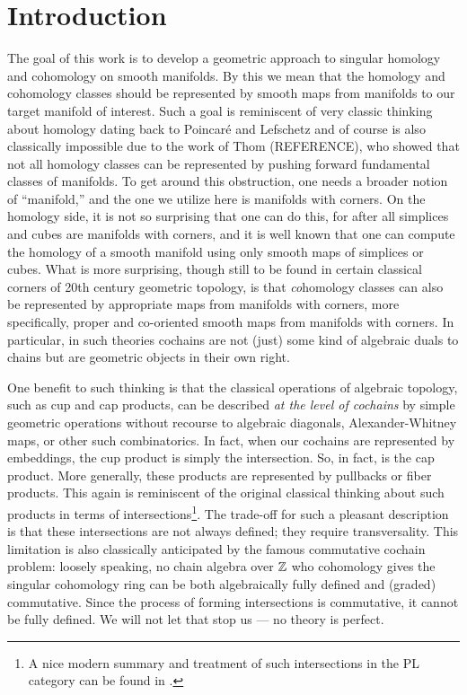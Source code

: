 
\section{Introduction}\label{intro}


The goal of this work is to develop a geometric approach to singular homology and cohomology on smooth manifolds. By this we mean that the homology and cohomology classes should be represented by smooth maps from manifolds to our target manifold of interest. Such a goal is reminiscent of very classic thinking about homology dating back to Poincar\'e and Lefschetz and of course is also classically impossible due to the work of Thom (REFERENCE), who showed that not all homology classes can be represented by pushing forward fundamental classes of manifolds. To get around this obstruction, one needs a broader notion of ``manifold,'' and the one we utilize here is manifolds with corners. On the homology side, it is not so surprising that one can do this, for after all simplices and cubes are manifolds with corners, and it is well known that one can compute the homology of a smooth manifold using only smooth maps of simplices or cubes. What is more surprising, though still to be found in certain classical corners of 20th century geometric topology, is that \textit{co}homology classes can also be represented by appropriate maps from manifolds with corners, more specifically, proper and co-oriented smooth maps from manifolds with corners. In particular, in such theories cochains are not (just) some kind of algebraic duals to chains but are geometric objects in their own right.

One benefit to such thinking is that the classical operations of algebraic topology, such as cup and cap products, can be described \textit{at the level of cochains} by simple geometric operations without recourse to algebraic diagonals, Alexander-Whitney maps, or other such combinatorics. In fact, when our cochains are represented by embeddings, the cup product is simply the intersection. So, in fact, is the cap product. More generally, these products are represented by pullbacks or fiber products. This again is reminiscent of the original classical thinking about such products in terms of intersections\footnote{A nice modern summary and treatment of such intersections in the PL category can be found in \cite{McC06}.}.
The trade-off for such a pleasant description is that these intersections are not always defined; they require transversality. This limitation is also classically anticipated by the famous commutative cochain problem: loosely speaking, no chain algebra over $\mathbb{Z}$ who cohomology gives the singular cohomology ring can be both algebraically fully defined and (graded) commutative. Since the process of forming intersections is commutative, it cannot be fully defined. We will not let that stop us --- no theory is perfect.

